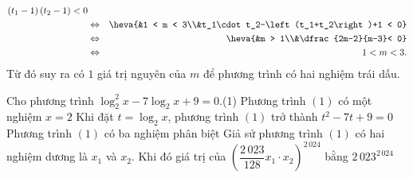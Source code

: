 \begin{ex}
{\begin{itemchoice}
\begin{eqnarray*}
{				\left(t_1-1\right)\left(t_2-1\right)  < 0}\\
				&\Leftrightarrow& \heva{&1  < m < 3\\&t_1\cdot t_2-\left(t_1+t_2\right)+1 < 0}\\
				&\Leftrightarrow& \heva{&m >  1\\&\dfrac{2m-2}{m-3}< 0}\\
				&\Leftrightarrow& 1 <  m < 3.
			\end{eqnarray*}
			Từ đó suy ra có $1$ giá trị nguyên của $m$ để phương trình có hai  nghiệm trái dấu.
		\end{itemchoice}
	 }
\end{ex}

\begin{ex}%
	Cho  phương trình $\log_2^2x-7\log_2x+9=0$.\quad(1)
	\choiceTF 
		{Phương trình $(1)$ có một nghiệm $x=2$} 
		{\True Khi đặt $t=\log_2x$,  phương trình $(1)$ trở thành $t^2-7t+9=0$}
		 {Phương trình $(1)$ có ba nghiệm phân biệt}
		{\True Giả sử phương trình $(1)$ có hai nghiệm dương  là $x_1$ và $x_2$. Khi đó giá trị của $\left(\dfrac{2\,023}{128}{x_1}\cdot x_2\right)^{2\,024}$ bằng $2\,023^{2\,024}$}
\end{ex}

